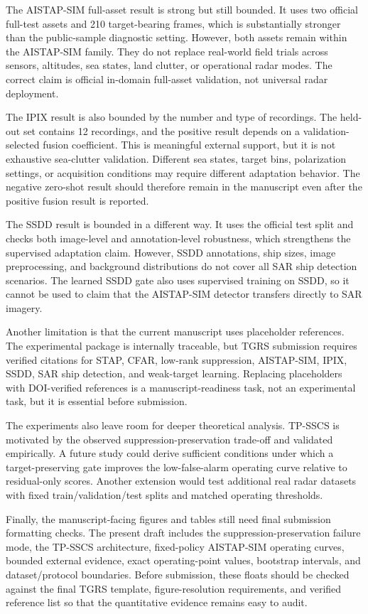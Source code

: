 \documentclass[journal]{IEEEtran}
\begin{document}
The AISTAP-SIM full-asset result is strong but still bounded. It uses two official full-test assets and 210 target-bearing frames, which is substantially stronger than the public-sample diagnostic setting. However, both assets remain within the AISTAP-SIM family. They do not replace real-world field trials across sensors, altitudes, sea states, land clutter, or operational radar modes. The correct claim is official in-domain full-asset validation, not universal radar deployment.

The IPIX result is also bounded by the number and type of recordings. The held-out set contains 12 recordings, and the positive result depends on a validation-selected fusion coefficient. This is meaningful external support, but it is not exhaustive sea-clutter validation. Different sea states, target bins, polarization settings, or acquisition conditions may require different adaptation behavior. The negative zero-shot result should therefore remain in the manuscript even after the positive fusion result is reported.

The SSDD result is bounded in a different way. It uses the official test split and checks both image-level and annotation-level robustness, which strengthens the supervised adaptation claim. However, SSDD annotations, ship sizes, image preprocessing, and background distributions do not cover all SAR ship detection scenarios. The learned SSDD gate also uses supervised training on SSDD, so it cannot be used to claim that the AISTAP-SIM detector transfers directly to SAR imagery.

Another limitation is that the current manuscript uses placeholder references. The experimental package is internally traceable, but TGRS submission requires verified citations for STAP, CFAR, low-rank suppression, AISTAP-SIM, IPIX, SSDD, SAR ship detection, and weak-target learning. Replacing placeholders with DOI-verified references is a manuscript-readiness task, not an experimental task, but it is essential before submission.

The experiments also leave room for deeper theoretical analysis. TP-SSCS is motivated by the observed suppression-preservation trade-off and validated empirically. A future study could derive sufficient conditions under which a target-preserving gate improves the low-false-alarm operating curve relative to residual-only scores. Another extension would test additional real radar datasets with fixed train/validation/test splits and matched operating thresholds.

Finally, the manuscript-facing figures and tables still need final submission formatting checks. The present draft includes the suppression-preservation failure mode, the TP-SSCS architecture, fixed-policy AISTAP-SIM operating curves, bounded external evidence, exact operating-point values, bootstrap intervals, and dataset/protocol boundaries. Before submission, these floats should be checked against the final TGRS template, figure-resolution requirements, and verified reference list so that the quantitative evidence remains easy to audit.
\end{document}
